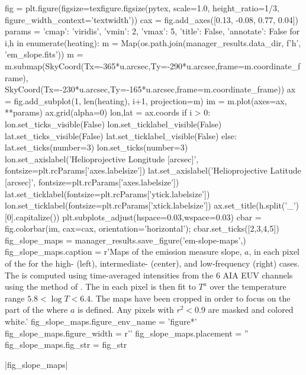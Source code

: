 \begin{pycode}
fig = plt.figure(figsize=texfigure.figsize(pytex, scale=1.0, height_ratio=1/3,
                                           figure_width_context='textwidth'))
cax = fig.add_axes([0.13, -0.08, 0.77, 0.04])
params = {'cmap': 'viridis', 'vmin': 2, 'vmax': 5, 'title': False, 'annotate': False}
for i,h in enumerate(heating):
    m = Map(os.path.join(manager_results.data_dir, f'{h}', 'em_slope.fits'))
    m = m.submap(SkyCoord(Tx=-365*u.arcsec,Ty=-290*u.arcsec,frame=m.coordinate_frame),
                 SkyCoord(Tx=-230*u.arcsec,Ty=-165*u.arcsec,frame=m.coordinate_frame))
    ax = fig.add_subplot(1, len(heating), i+1, projection=m)
    im = m.plot(axes=ax, **params)
    ax.grid(alpha=0)
    lon,lat = ax.coords
    if i > 0:
        lon.set_ticks_visible(False)
        lon.set_ticklabel_visible(False)
        lat.set_ticks_visible(False)
        lat.set_ticklabel_visible(False)
    else:
        lat.set_ticks(number=3)
        lon.set_ticks(number=3)
        lon.set_axislabel('Helioprojective Longitude [arcsec]',
                          fontsize=plt.rcParams['axes.labelsize'])
        lat.set_axislabel('Helioprojective Latitude [arcsec]',
                          fontsize=plt.rcParams['axes.labelsize'])
        lat.set_ticklabel(fontsize=plt.rcParams['ytick.labelsize'])
        lon.set_ticklabel(fontsize=plt.rcParams['xtick.labelsize'])
    ax.set_title(h.split('_')[0].capitalize())
plt.subplots_adjust(hspace=0.03,wspace=0.03)
cbar = fig.colorbar(im, cax=cax, orientation='horizontal');
cbar.set_ticks([2,3,4,5])
fig_slope_maps = manager_results.save_figure('em-slope-maps',)
fig_slope_maps.caption = r'Maps of the emission measure slope, $a$, in each pixel of the \AR{} for the high- (left), intermediate- (center), and low-frequency (right) cases. The \dem{} is computed using time-averaged intensities from the 6 AIA EUV channels using the method of \citet{hannah_differential_2012}. The \dem{} in each pixel is then fit to $T^a$ over the temperature range $5.8<\log{T}<6.4$. The maps have been cropped in order to focus on the part of the \AR{} where $a$ is defined. Any pixels with $r^2<0.9$ are masked and colored white.'
fig_slope_maps.figure_env_name = 'figure*'
fig_slope_maps.figure_width = r'\textwidth'
fig_slope_maps.placement = ''
fig_slope_maps.fig_str = fig_str
\end{pycode}
|fig_slope_maps|

